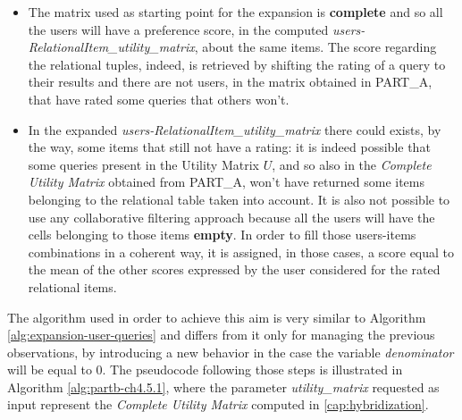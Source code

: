 \begin{itemize}
    \item The matrix used as starting point for the expansion is \textbf{complete} and so all the users will have a preference score, in the computed \textit{users-RelationalItem\_utility\_matrix}, about the same items. The score regarding the relational tuples, indeed, is retrieved by shifting the rating of a query to their results and there are not users, in the matrix obtained in PART\_A, that have rated some queries that others won't.
    \item In the expanded \textit{users-RelationalItem\_utility\_matrix} there could exists, by the way, some items that still not have a rating: it is indeed possible that some queries present in the Utility Matrix $U$, and so also in the \textit{Complete Utility Matrix} obtained from PART\_A, won't have returned some items belonging to the relational table taken into account. It is also not possible to use any collaborative filtering approach because all the users will have the cells belonging to those items \textbf{empty}. In order to fill those users-items combinations in a coherent way, it is assigned, in those cases, a score equal to the mean of the other scores expressed by the user considered for the rated relational items.
\end{itemize}
The algorithm used in order to achieve this aim is very similar to Algorithm \ref{alg:expansion-user-queries} and differs from it only for managing the previous observations, by introducing a new behavior in the case the variable \textit{denominator} will be equal to 0. The pseudocode following those steps is illustrated in Algorithm \ref{alg:partb-ch4.5.1}, where the parameter \textit{utility\_matrix} requested as input represent the \textit{Complete Utility Matrix} computed in \ref{cap:hybridization}.

